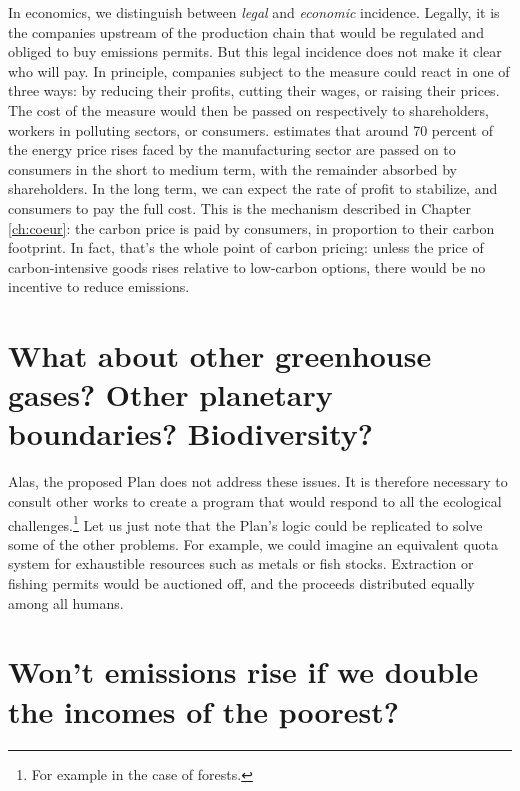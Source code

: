 \documentclass[a5paper,english,openany]{memoir}
\begin{document}
 In economics, we distinguish between \textit{legal} and \textit{economic} incidence. Legally, it is the companies upstream of the production chain that would be regulated and obliged to buy emissions permits. But this legal incidence does not make it clear who will pay. In principle, %
 companies subject to the measure could react in one of three ways: by reducing their profits, cutting their wages, or raising their prices. The cost of the measure would then be passed on respectively to shareholders, workers in polluting sectors, or consumers. \cite{ganapati_energy_2020} estimates that around 70 percent of the energy price rises faced by the manufacturing sector are passed on to consumers in the short to medium term, with the remainder absorbed by shareholders. In the long term, we can expect the rate of profit to stabilize, %
 and consumers to pay the full cost. This is the mechanism described in Chapter \ref{ch:coeur}: the carbon price is paid by consumers, in proportion to their carbon footprint. In fact, that's the whole point of carbon pricing: unless the price of carbon-intensive goods rises relative to low-carbon options, there would be no incentive to reduce emissions.
 
\section*{\normalsize What about other greenhouse gases? Other planetary boundaries? Biodiversity?}\label{q:scope}

Alas, the proposed Plan does not address these issues. It is therefore necessary to consult other works %
to create %
a program that would respond to all the ecological challenges.\footnote{For example \citet{strassburg_reducing_2009,karsenty_geopolitique_2021} in the case of forests.} %
Let us %
just note that the Plan's logic could be replicated to solve some of the other problems. %
For example, we could imagine an equivalent quota system for exhaustible resources such as metals or fish stocks. Extraction or fishing permits would be auctioned off, and the proceeds distributed equally among all humans.
\section*{\normalsize Won't emissions rise if we double the incomes of the poorest?}\label{q:emissions}
\end{document}
